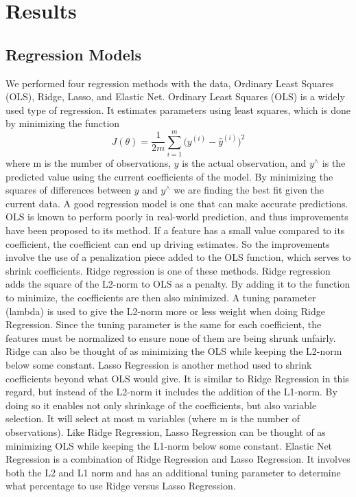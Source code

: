 \documentclass{article}
\begin{document}
\section{Results}

\subsection{Regression Models}

We performed four regression methods with the data, Ordinary Least Squares (OLS), Ridge, Lasso, and Elastic Net.
Ordinary Least Squares (OLS) is a widely used type of regression. It estimates parameters using least squares, which is done by minimizing the function 
$$ J(\theta) = \dfrac{1}{2m}\sum_{i = 1}^{m} \big( y^{(i)} - \hat y^{(i)}  \big)^2 $$
where m is the number of observations, $y$ is the actual observation, and $y^{\wedge}$ is the predicted value using the current coefficients of the model. By minimizing the squares of differences between $y$ and $y^{\wedge}$ we are finding the best fit given the current data.
A good regression model is one that can make accurate predictions. OLS is known to perform poorly in real-world prediction, and thus improvements have been proposed to its method. If a feature has a small value compared to its coefficient, the coefficient can end up driving estimates. So the improvements involve the use of a penalization piece added to the OLS function, which serves to shrink coefficients.
Ridge regression is one of these methods. Ridge regression adds the square of the L2-norm to OLS as a penalty. By adding it to the function to minimize, the coefficients are then also minimized. A tuning parameter (lambda) is used to give the L2-norm more or less weight when doing Ridge Regression. Since the tuning parameter is the same for each coefficient, the features must be normalized to ensure none of them are being shrunk unfairly. Ridge can also be thought of as minimizing the OLS while keeping the L2-norm below some constant.
Lasso Regression is another method used to shrink coefficients beyond what OLS would give. It is similar to Ridge Regression in this regard, but instead of the L2-norm it includes the addition of the L1-norm. By doing so it enables not only shrinkage of the coefficients, but also variable selection. It will select at most m variables (where m is the number of observations). Like Ridge Regression, Lasso Regression can be thought of as minimizing OLS while keeping the L1-norm below some constant.
Elastic Net Regression is a combination of Ridge Regression and Lasso Regression. It involves both the L2 and L1 norm and has an additional tuning parameter to determine what percentage to use Ridge versus Lasso Regression.
\end{document}
